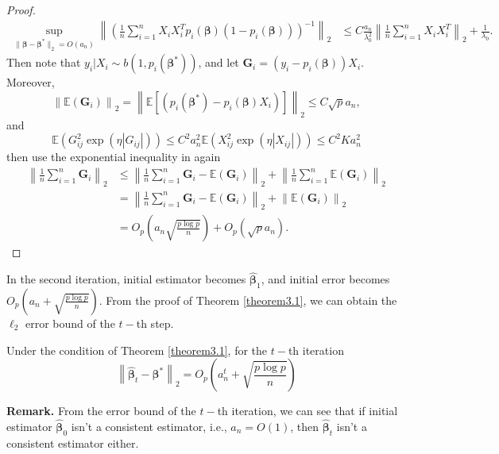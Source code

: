 \begin{proof}
	 \begin{align*}
	 \sup_{\|\boldsymbol{\beta}-\boldsymbol{\beta}^{*}\|_2=O(a_n)}\left\|\left(\frac{1}{n}\sum_{i=1}^{n} X_{i} X_{i}^{T} p_{i}(\boldsymbol{\beta})\left(1-p_{i}(\boldsymbol{\beta})\right)\right)^{-1}\right\|_2 &\leq C\frac{a_n}{\lambda_0^2}\left\|\frac{1}{n}\sum_{i=1}^{n} X_{i} X_{i}^{T}\right\|_2 + \frac{1}{\lambda_0}.
	 \end{align*}
	 Then note that $y_i|X_i \sim b(1, p_{i}(\boldsymbol{\beta}^{*}))$, and let $\boldsymbol{G}_i=\left(y_{i}-p_{i}(\boldsymbol{\beta})\right) X_{i}$. 
	 Moreover,
	 $$
	 \left\|\mathbb{E}\left(\boldsymbol{G}_i\right)\right\|_2=\left\|\mathbb{E}\left[\left(p_i\left(\boldsymbol{\beta}^{*}\right)-p_i\left(\boldsymbol{\beta}\right)X_i\right)\right]\right\|_2\leq C\sqrt{p}a_n,
	 $$
	 and
	 $$
	\mathbb{E}\left(G_{ij}^2\exp(\eta|G_{ij}|)\right)\leq C^2a_n^2\mathbb{E}\left(X_{ij}^2\exp(\eta|X_{ij}|)\right)\leq C^2Ka_n^2
	 $$
	 then use the exponential inequality in \citet{cai2011constrained} again
	 \begin{align*}
	 \left\|\frac{1}{n}\sum_{i=1}^{n}\boldsymbol{G}_i\right\|_2&\leq \left\|\frac{1}{n}\sum_{i=1}^{n}\boldsymbol{G}_i-\mathbb{E}\left(\boldsymbol{G}_i\right)\right\|_2+\left\|\frac{1}{n}\sum_{i=1}^{n}\mathbb{E}\left(\boldsymbol{G}_i\right)\right\|_2\\
	 &=\left\|\frac{1}{n}\sum_{i=1}^{n}\boldsymbol{G}_i-\mathbb{E}\left(\boldsymbol{G}_i\right)\right\|_2+\left\|\mathbb{E}\left(\boldsymbol{G}_i\right)\right\|_2\\
	 &=O_p\left(a_n\sqrt{\frac{p\log p}{n}}\right)+O_p\left(\sqrt{p}a_n\right).
	 \end{align*}
\end{proof}

In the second iteration, initial estimator becomes $\widehat{\boldsymbol{\beta}}_1$, and initial error becomes $O_p\left(a_n+\sqrt{\frac{p\log p}{n}}\right)$. From the proof of Theorem \ref{theorem3.1}, we can obtain the $\ell_2$ error bound of the $t-$th step.
\begin{corollary}
	Under the condition of Theorem \ref{theorem3.1}, for the $t-$th iteration
	\begin{equation}
		\left\|\widehat{\boldsymbol{\beta}}_t-\boldsymbol{\beta}^{*}\right\|_2=O_p\left(a_n^t+\sqrt{\frac{p\log p}{n}}\right)
	\end{equation}
\end{corollary}
\textbf{Remark.} From the error bound of the $t-$th iteration, we can see that if initial estimator $\widehat{\boldsymbol{\beta}}_0$ isn't a consistent estimator, i.e., $a_n=O(1)$, then $\widehat{\boldsymbol{\beta}}_t$ isn't a consistent estimator either.